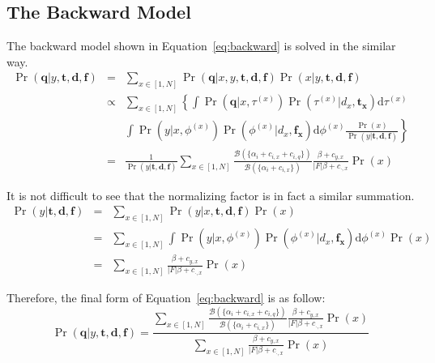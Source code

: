 \subsection{The Backward Model}\label{ss:backward-model}
The backward model shown in Equation~\eqref{eq:backward} is solved in the similar way.
\begin{eqnarray}
  \Pr(\mathbf{q}|y, \mathbf{t}, \mathbf{d}, \mathbf{f}) 
  &=& \sum_{x \in [1, N]} \Pr(\mathbf{q}|x, y, \mathbf{t}, \mathbf{d}, \mathbf{f}) \Pr(x|y, \mathbf{t}, \mathbf{d}, \mathbf{f}) \nonumber\\
  &\propto& \sum_{x \in [1, N]} \left\{ \int \Pr(\mathbf{q}|x, \tau^{(x)}) \Pr(\tau^{(x)}|d_x, \mathbf{t_x}) \mathrm{d}\tau^{(x)} \right. \nonumber\\
  && \left. \int \Pr(y| x, \phi^{(x)}) \Pr(\phi^{(x)}|d_x, \mathbf{f_x})\mathrm{d}\phi^{(x)} \frac{\Pr(x)}{\Pr(y|\mathbf{t}, \mathbf{d}, \mathbf{f})} \right\} \nonumber\\
  &=& \frac{1}{\Pr(y|\mathbf{t}, \mathbf{d}, \mathbf{f})} \sum_{x \in [1, N]} \frac{\mathcal{B}(\{\alpha_i + c_{i,x} + c_{i,q} \})}{\mathcal{B}(\{\alpha_i + c_{i,x} \})} \frac{\beta + c_{y,x}}{|F|\beta + c_{\cdot,x}} \Pr(x) \nonumber
\end{eqnarray}

It is not difficult to see that the normalizing factor is in fact a similar summation.
\begin{eqnarray}
  \Pr(y|\mathbf{t}, \mathbf{d}, \mathbf{f})
  &=& \sum_{x \in [1, N]} \Pr(y|x, \mathbf{t}, \mathbf{d}, \mathbf{f}) \Pr(x) \nonumber\\
  &=& \sum_{x \in [1, N]} \int \Pr(y|x, \phi^{(x)}) \Pr(\phi^{(x)}|d_x, \mathbf{f_x}) \mathrm{d}\phi^{(x)} \Pr(x) \nonumber\\
  &=& \sum_{x \in [1, N]} \frac{\beta + c_{y,x}}{|F|\beta + c_{\cdot,x}} \Pr(x) \nonumber
\end{eqnarray}

Therefore, the final form of Equation~\eqref{eq:backward} is as follow:
\begin{equation}\label{eq:backward-solution}
  \Pr(\mathbf{q}|y, \mathbf{t}, \mathbf{d}, \mathbf{f}) = 
  \frac{\sum_{x \in [1, N]} \frac{\mathcal{B}(\{\alpha_i + c_{i,x} + c_{i,q} \})}{\mathcal{B}(\{\alpha_i + c_{i,x} \})} \frac{\beta + c_{y,x}}{|F|\beta + c_{\cdot,x}} \Pr(x)}
  {\sum_{x \in [1, N]} \frac{\beta + c_{y,x}}{|F|\beta + c_{\cdot,x}} \Pr(x)}
\end{equation}

